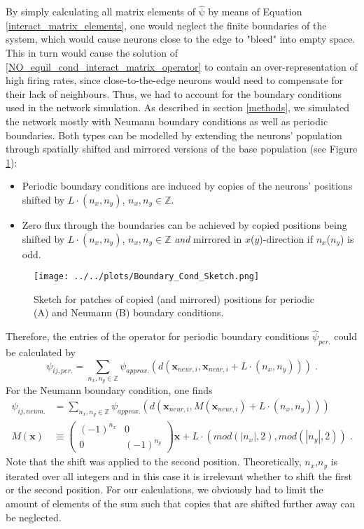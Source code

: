 \documentclass[10pt,a4paper]{article}
\begin{document}
By simply calculating all matrix elements of $\mathrm{\hat{\psi}}$ by means of Equation \eqref{interact_matrix_elements}, one would neglect the finite boundaries of the system, which would cause neurons close to the edge to "bleed" into empty space. This in turn would cause the solution of \eqref{NO_equil_cond_interact_matrix_operator} to contain an over-representation of high firing rates, since close-to-the-edge neurons would need to compensate for their lack of neighbours. Thus, we had to account for the boundary conditions used in the network simulation. As described in section \ref{methods}, we simulated the network mostly with Neumann boundary conditions as well as periodic boundaries. Both types can be modelled by extending the neurons' population through spatially shifted and mirrored versions of the base population (see Figure \ref{Bound_Cond_Patches}):
\begin{itemize}
\item Periodic boundary conditions are induced by copies of the neurons' positions shifted by $L\cdot (n_x,n_y)$, $n_x,n_y \in \mathbb{Z}$.
\item Zero flux through the boundaries can be achieved by copied positions being shifted by $L\cdot (n_x,n_y)$, $n_x,n_y \in \mathbb{Z}$ \textit{and} mirrored in $x$($y$)-direction if $n_x$($n_y$) is odd.
\end{itemize}
\begin{figure}
\begin{center}
\texttt{[image: ../../plots/Boundary\_Cond\_Sketch.png]}
\end{center}
\caption{Sketch for patches of copied (and mirrored) positions for periodic (A) and Neumann (B) boundary conditions.}
\label{Bound_Cond_Patches}
\end{figure}
Therefore, the entries of the operator for periodic boundary conditions $\hat{\psi}_{per.}$ could be calculated by
\begin{equation}
\psi_{ij,per.} = \sum_{n_x,n_y \in \mathbb{Z}} \psi_{approx.} (d(\mathbf{x}_{neur,i},\mathbf{x}_{neur,i} + L \cdot (n_x,n_y))) \; .
\label{Psi_entries_periodic_bound}
\end{equation}
For the Neumann boundary condition, one finds
\begin{align}
\psi_{ij,neum.} &= \sum_{n_x,n_y \in \mathbb{Z}} \psi_{approx.} \left( d(\mathbf{x}_{neur,i},M(\mathbf{x}_{neur,i}) + L \cdot (n_x,n_y)) \right) \label{Psi_entries_neumann_bound} \\
M(\mathbf{x}) &\equiv  
 \begin{pmatrix}
  (-1)^{n_x} & 0\\
  0 & (-1)^{n_y}
 \end{pmatrix}
\mathbf{x} + L \cdot (mod(\left| n_x\right|,2),mod(\left| n_y\right|,2)) \; . \label{Mirror_Operator}
\end{align}
Note that the shift was applied to the second position. Theoretically, $n_x$,$n_y$ is iterated over all integers and in this case it is irrelevant whether to shift the first or the second position. For our calculations, we obviously had to limit the amount of elements of the sum such that copies that are shifted further away can be neglected.
\end{document}
